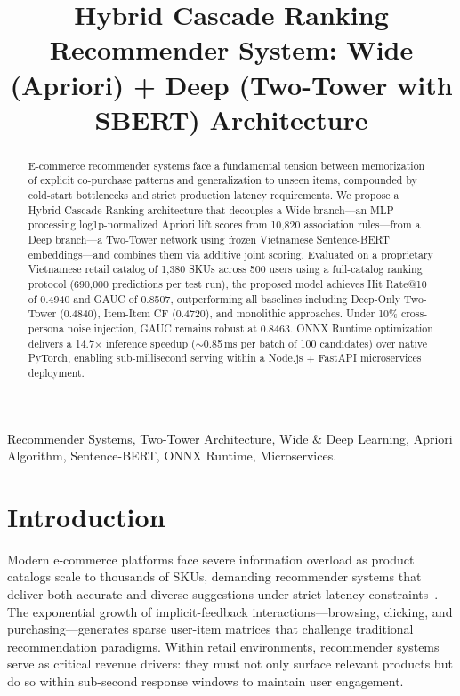 \documentclass[10pt,conference]{IEEEtran}
\begin{document}
\title{Hybrid Cascade Ranking Recommender System: Wide (Apriori) + Deep (Two-Tower with SBERT) Architecture}

\author{
}

\maketitle

\begin{abstract}
E-commerce recommender systems face a fundamental tension between memorization of explicit co-purchase patterns and generalization to unseen items, compounded by cold-start bottlenecks and strict production latency requirements. We propose a Hybrid Cascade Ranking architecture that decouples a Wide branch---an MLP processing log1p-normalized Apriori lift scores from 10,820 association rules---from a Deep branch---a Two-Tower network using frozen Vietnamese Sentence-BERT embeddings---and combines them via additive joint scoring. Evaluated on a proprietary Vietnamese retail catalog of 1,380 SKUs across 500 users using a full-catalog ranking protocol (690,000 predictions per test run), the proposed model achieves Hit Rate@10 of 0.4940 and GAUC of 0.8507, outperforming all baselines including Deep-Only Two-Tower (0.4840), Item-Item CF (0.4720), and monolithic approaches. Under 10\% cross-persona noise injection, GAUC remains robust at 0.8463. ONNX Runtime optimization delivers a 14.7$\times$ inference speedup ($\sim$0.85\,ms per batch of 100 candidates) over native PyTorch, enabling sub-millisecond serving within a Node.js + FastAPI microservices deployment.
\end{abstract}

\begin{IEEEkeywords}
Recommender Systems, Two-Tower Architecture, Wide \& Deep Learning, Apriori Algorithm, Sentence-BERT, ONNX Runtime, Microservices.
\end{IEEEkeywords}

\section{Introduction}
\label{sec:intro}

Modern e-commerce platforms face severe information overload as product catalogs scale to thousands of SKUs, demanding recommender systems that deliver both accurate and diverse suggestions under strict latency constraints~\cite{zhang2019deep, covington2016deep}. The exponential growth of implicit-feedback interactions---browsing, clicking, and purchasing---generates sparse user-item matrices that challenge traditional recommendation paradigms. Within retail environments, recommender systems serve as critical revenue drivers: they must not only surface relevant products but do so within sub-second response windows to maintain user engagement.
\end{document}
